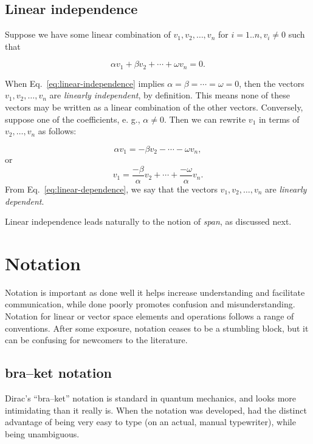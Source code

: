 \documentclass{article}
\begin{document}
\subsection{Linear independence}

Suppose we have some linear combination of $v_1, v_2,\ldots, v_n$
for $i = 1..n, v_i \neq 0$ such that

\begin{equation}
  \label{eq:linear-independence}
  \alpha v_1 + \beta v_2 + \cdots + \omega v_n = 0.
\end{equation}

When Eq.~\ref{eq:linear-independence} implies $\alpha = \beta = \cdots = \omega = 0$, then
the vectors $v_1, v_2,\ldots, v_n$ are \textit{linearly independent}, by definition.
This means none of these vectors may be written as a linear combination of
the other vectors. Conversely, suppose one of the coefficients, e. g., $\alpha \neq 0$.
Then we can rewrite $v_1$ in terms of $v_2,\ldots, v_n$ as follows:

\[ %
  \alpha v_1 = -\beta v_2 - \cdots - \omega v_n,
\] %
or
\begin{equation}
  \label{eq:linear-dependence}
  v_1 = \frac{-\beta}{\alpha}v_2 + \cdots + \frac{-\omega}{\alpha}v_n.
\end{equation}
From Eq.~\ref{eq:linear-dependence}, we say that the vectors $v_1, v_2,\ldots, v_n$
are \textit{linearly dependent}.

Linear independence leads naturally to the notion of \textit{span}, as discussed next.


\appendix

\section{Notation}

Notation is important as done well it helps increase understanding and
facilitate communication, while done poorly promotes confusion and
misunderstanding.  Notation for linear or vector space elements and operations
follows a range of conventions. After some exposure, notation ceases to be a
stumbling block, but it can be confusing for newcomers to the literature.

\subsection{bra--ket notation}

Dirac's ``bra--ket'' notation is standard in quantum mechanics, and looks
more intimidating than it really is. When the notation was developed, had
the distinct advantage of being very easy to type (on an actual, manual
typewriter), while being unambiguous.
\end{document}
